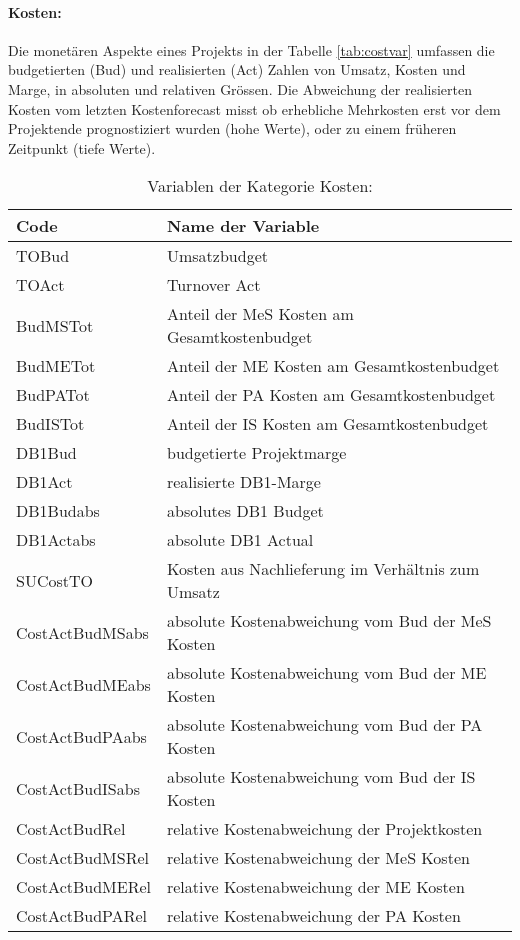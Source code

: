 \paragraph{Kosten:} Die monetären Aspekte eines Projekts in der Tabelle \ref{tab:costvar} umfassen die budgetierten (Bud) und realisierten (Act) Zahlen von Umsatz, Kosten und Marge, in absoluten und relativen Grössen. Die Abweichung der realisierten Kosten vom letzten Kostenforecast misst ob erhebliche Mehrkosten erst vor dem Projektende prognostiziert wurden (hohe Werte), oder zu einem früheren Zeitpunkt (tiefe Werte). 
\begin{table}[H]
	\centering
	\caption{Variablen der Kategorie Kosten:}
	\begin{tabular}{ll}
		\toprule
		\textbf{Code} & \textbf{Name der Variable} \\
		\midrule
		TOBud & Umsatzbudget \\
		TOAct & Turnover Act \\
		BudMSTot & Anteil der MeS Kosten am Gesamtkostenbudget \\
		BudMETot & Anteil der ME Kosten am Gesamtkostenbudget \\
		BudPATot & Anteil der PA Kosten am Gesamtkostenbudget \\
		BudISTot & Anteil der IS Kosten am Gesamtkostenbudget \\
		DB1Bud & budgetierte  Projektmarge \\
		DB1Act & realisierte DB1-Marge \\
		DB1Budabs & absolutes DB1 Budget  \\
		DB1Actabs & absolute DB1 Actual \\
		SUCostTO & Kosten aus Nachlieferung im Verhältnis zum Umsatz \\
		CostActBudMSabs & absolute Kostenabweichung vom Bud der MeS Kosten \\
		CostActBudMEabs & absolute Kostenabweichung vom Bud der ME Kosten \\
		CostActBudPAabs & absolute Kostenabweichung vom Bud der PA Kosten \\
		CostActBudISabs & absolute Kostenabweichung vom Bud der IS Kosten \\
		CostActBudRel & relative Kostenabweichung  der Projektkosten \\
		CostActBudMSRel & relative Kostenabweichung der MeS Kosten \\
		CostActBudMERel & relative Kostenabweichung der ME Kosten \\
		CostActBudPARel & relative Kostenabweichung der PA Kosten \\

\end{tabular}
\end{table}
